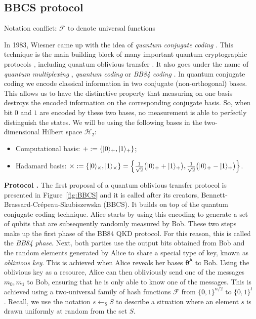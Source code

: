 \subsection{BBCS protocol}\label{sec:BBCS}

{\cv Notation conflict: $\mathcal{F}$ to denote universal functions}

In 1983, Wiesner came up with the idea of \textit{quantum conjugate coding} \cite{W83}. This technique is the main building block of many important quantum cryptographic protocols \cite{BB84, BBBW83, DFSS14}, including quantum oblivious transfer \cite{BBCS92}. It also goes under the name of \textit{quantum multiplexing} \cite{BBBW83}, \textit{quantum coding} \cite{BBB14} or \textit{BB84 coding} \cite{S99}. In quantum conjugate coding we encode classical information in two conjugate (non-orthogonal) bases. This allows us to have the distinctive property that measuring on one basis destroys the encoded information on the corresponding conjugate basis. So, when bit $0$ and $1$ are encoded by these two bases, no measurement is able to perfectly distinguish the states. We will be using the following bases in the two-dimensional Hilbert space $\mathcal{H}_2$:

\begin{itemize}
    \item Computational basis: $+ := \left\{| 0 \rangle_{+}, | 1 \rangle_{+}\right\}$;
    \item Hadamard basis: $\times := \left\{| 0 \rangle_{\times}, | 1 \rangle_{\times}\right\} = \left\{\frac{1}{\sqrt{2}}\big( | 0 \rangle_{+} + | 1 \rangle_{+} \big), \frac{1}{\sqrt{2}}\big( | 0 \rangle_{+} - | 1 \rangle_{+} \big) \right\}$.
\end{itemize}

\noindent\textbf{Protocol \cite{BBCS92}.} The first proposal of a quantum oblivious transfer protocol is presented in Figure~\ref{fig:BBCS} and it is called after its creators, Bennett-Brassard-Cr{\'e}peau-Skubiszewska (BBCS). It builds on top of the quantum conjugate coding technique. Alice starts by using this encoding to generate a set of qubits that are subsequently randomly measured by Bob. These two steps make up the first phase of the BB84 QKD protocol. For this reason, this is called the \textit{BB84 phase}. Next, both parties use the output bits obtained from Bob and the random elements generated by Alice to share a special type of key, known as \textit{oblivious key}. This is achieved when Alice reveals her bases $\bm{\theta}^{\mathsf{A}}$ to Bob. Using the oblivious key as a resource, Alice can then obliviously send one of the messages $m_0, m_1$ to Bob, ensuring that he is only able to know one of the messages. This is achieved using a two-universal family of hash functions $\mathcal{F}$ from $\{0,1\}^{n/2}$ to $\{0,1\}^{l}$. Recall, we use the notation $s\leftarrow_{\$}S$ to describe a situation where an element $s$ is drawn uniformly at random from the set $S$.

